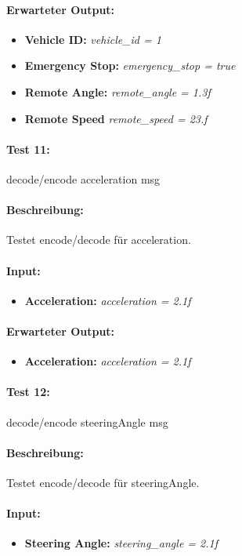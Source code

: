 \documentclass[a4paper, 12pt, titlepage]{scrartcl}
\begin{document}
{			\paragraph{Erwarteter Output:}
			\begin{itemize} \itemsep-0.5em
				\item \textbf{Vehicle ID:} \emph{vehicle\_id = 1}
				\item \textbf{Emergency Stop:} \emph{emergency\_stop = true}
				\item \textbf{Remote Angle:} \emph{remote\_angle = 1.3f}
				\item \textbf{Remote Speed} \emph{remote\_speed = 23.f}
			\end{itemize}

			\paragraph{Test 11:}{decode/encode acceleration msg}
			\paragraph{Beschreibung:} Testet encode/decode für acceleration.
			\paragraph{Input:}
			\begin{itemize} \itemsep-0.5em
				\item \textbf{Acceleration:} \emph{acceleration = 2.1f}
			\end{itemize}
			\paragraph{Erwarteter Output:}
			\begin{itemize} \itemsep-0.5em
				\item \textbf{Acceleration:} \emph{acceleration = 2.1f}
			\end{itemize}

			\paragraph{Test 12:}{decode/encode steeringAngle msg}
			\paragraph{Beschreibung:} Testet encode/decode für steeringAngle.
			\paragraph{Input:}
			\begin{itemize} \itemsep-0.5em
				\item \textbf{Steering Angle:} \emph{steering\_angle = 2.1f}
			\end{itemize}
}
\end{document}
